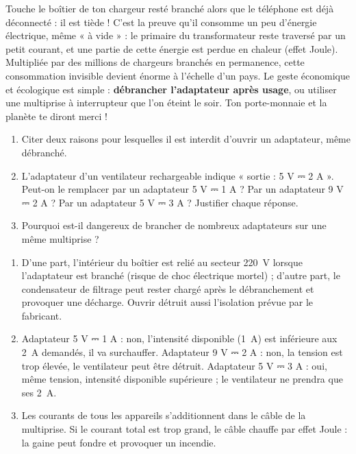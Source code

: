 \documentclass[11pt]{article}
\begin{document}
\begin{savaistu}
Touche le boîtier de ton chargeur resté branché alors que le téléphone est déjà déconnecté : il est tiède ! C'est la preuve qu'il consomme un peu d'énergie électrique, même « à vide » : le primaire du transformateur reste traversé par un petit courant, et une partie de cette énergie est perdue en chaleur (effet Joule). Multipliée par des millions de chargeurs branchés en permanence, cette consommation invisible devient énorme à l'échelle d'un pays. Le geste économique et écologique est simple : \textbf{débrancher l'adaptateur après usage}, ou utiliser une multiprise à interrupteur que l'on éteint le soir. Ton porte-monnaie et la planète te diront merci !
\end{savaistu}

\begin{exercice}
\begin{enumerate}
\item Citer deux raisons pour lesquelles il est interdit d'ouvrir un adaptateur, même débranché.
\item L'adaptateur d'un ventilateur rechargeable indique « sortie : 5 V ⎓ 2 A ». Peut-on le remplacer par un adaptateur 5 V ⎓ 1 A ? Par un adaptateur 9 V ⎓ 2 A ? Par un adaptateur 5 V ⎓ 3 A ? Justifier chaque réponse.
\item Pourquoi est-il dangereux de brancher de nombreux adaptateurs sur une même multiprise ?
\end{enumerate}
\end{exercice}

\begin{corrige}
\begin{enumerate}
\item D'une part, l'intérieur du boîtier est relié au secteur \SI{220}{V} lorsque l'adaptateur est branché (risque de choc électrique mortel) ; d'autre part, le condensateur de filtrage peut rester chargé après le débranchement et provoquer une décharge. Ouvrir détruit aussi l'isolation prévue par le fabricant.
\item Adaptateur 5 V ⎓ 1 A : non, l'intensité disponible (\SI{1}{A}) est inférieure aux \SI{2}{A} demandés, il va surchauffer. Adaptateur 9 V ⎓ 2 A : non, la tension est trop élevée, le ventilateur peut être détruit. Adaptateur 5 V ⎓ 3 A : oui, même tension, intensité disponible supérieure ; le ventilateur ne prendra que ses \SI{2}{A}.
\item Les courants de tous les appareils s'additionnent dans le câble de la multiprise. Si le courant total est trop grand, le câble chauffe par effet Joule : la gaine peut fondre et provoquer un incendie.
\end{enumerate}
\end{corrige}
\end{document}
